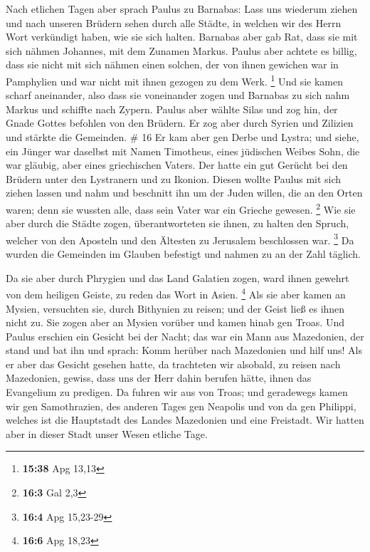  Nach etlichen Tagen aber sprach Paulus zu Barnabas: Lass
uns wiederum ziehen und nach unseren Brüdern sehen durch alle Städte, in
welchen wir des Herrn Wort verkündigt haben, wie sie sich halten.
 Barnabas aber gab Rat, dass sie mit sich nähmen
Johannes, mit dem Zunamen Markus.  Paulus aber achtete es
billig, dass sie nicht mit sich nähmen einen solchen, der von ihnen
gewichen war in Pamphylien und war nicht mit ihnen gezogen zu dem Werk.
\footnote{\textbf{15:38} Apg 13,13}  Und sie kamen scharf
aneinander, also dass sie voneinander zogen und Barnabas zu sich nahm
Markus und schiffte nach Zypern.  Paulus aber wählte
Silas und zog hin, der Gnade Gottes befohlen von den Brüdern.
 Er zog aber durch Syrien und Zilizien und stärkte die
Gemeinden. \# 16  Er kam aber gen Derbe und Lystra; und
siehe, ein Jünger war daselbst mit Namen Timotheus, eines jüdischen
Weibes Sohn, die war gläubig, aber eines griechischen Vaters.
 Der hatte ein gut Gerücht bei den Brüdern unter den
Lystranern und zu Ikonion.  Diesen wollte Paulus mit sich
ziehen lassen und nahm und beschnitt ihn um der Juden willen, die an den
Orten waren; denn sie wussten alle, dass sein Vater war ein Grieche
gewesen. \footnote{\textbf{16:3} Gal 2,3}  Wie sie aber
durch die Städte zogen, überantworteten sie ihnen, zu halten den Spruch,
welcher von den Aposteln und den Ältesten zu Jerusalem beschlossen war.
\footnote{\textbf{16:4} Apg 15,23-29}  Da wurden die
Gemeinden im Glauben befestigt und nahmen zu an der Zahl täglich.

 Da sie aber durch Phrygien und das Land Galatien zogen,
ward ihnen gewehrt von dem heiligen Geiste, zu reden das Wort in Asien.
\footnote{\textbf{16:6} Apg 18,23}  Als sie aber kamen an
Mysien, versuchten sie, durch Bithynien zu reisen; und der Geist ließ es
ihnen nicht zu.  Sie zogen aber an Mysien vorüber und
kamen hinab gen Troas.  Und Paulus erschien ein Gesicht
bei der Nacht; das war ein Mann aus Mazedonien, der stand und bat ihn
und sprach: Komm herüber nach Mazedonien und hilf uns! 
Als er aber das Gesicht gesehen hatte, da trachteten wir alsobald, zu
reisen nach Mazedonien, gewiss, dass uns der Herr dahin berufen hätte,
ihnen das Evangelium zu predigen.  Da fuhren wir aus von
Troas; und geradewegs kamen wir gen Samothrazien, des anderen Tages gen
Neapolis  und von da gen Philippi, welches ist die
Hauptstadt des Landes Mazedonien und eine Freistadt. Wir hatten aber in
dieser Stadt unser Wesen etliche Tage.

